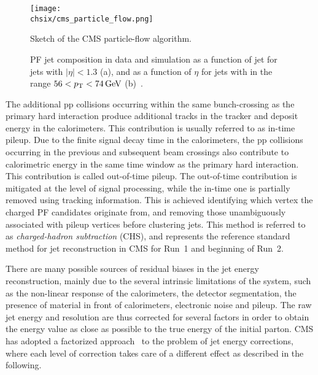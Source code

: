 \begin{figure}[!htb]
 \begin{center}
  \texttt{[image: \\chsix/cms\_particle\_flow.png]}
 \end{center}
 \caption{Sketch of the CMS particle-flow algorithm.}
 \label{fig:PFalgo}
\end{figure}

\begin{figure}[!htb]
\centering
{}
\caption{PF jet composition in data and simulation as a function of jet \pt for jets with $|\eta| < 1.3$ (a), and as a function of $\eta$ for jets with \pt in the range $56 < p_{\mathrm{T}} < 74\,\text{Ge\hspace{-.08em}V}$ (b)~\cite{Khachatryan:2016kdb}.}
\label{fig:PFjet_composition}
\end{figure}

The additional pp collisions occurring within the same bunch-crossing as the primary hard interaction produce additional tracks in the tracker and deposit energy in the calorimeters. This contribution is usually referred to as in-time pileup. Due to the finite signal decay time in the calorimeters, the pp collisions occurring in the previous and subsequent beam crossings also contribute to calorimetric energy in the same time window as the primary hard interaction. This contribution is called out-of-time pileup.
The out-of-time contribution is mitigated at the level of signal processing, while the in-time one is partially removed using tracking information. This is achieved identifying which vertex the charged PF candidates originate from, and removing those unambiguously associated with pileup vertices before clustering jets. This method is referred to as \textit{charged-hadron subtraction} (CHS), and represents the reference standard method for jet reconstruction in CMS for Run~1 and beginning of Run~2.

There are many possible sources of residual biases in the jet energy reconstruction, mainly due to the several intrinsic limitations of the system, such as the non-linear response of the calorimeters, the detector segmentation, the presence of material in front of calorimeters, electronic noise and pileup. The raw jet energy and resolution are thus corrected for several factors in order to obtain the energy value as close as possible to the true energy of the initial parton. CMS has adopted a factorized approach~\cite{1748-0221-6-11-P11002} to the problem of jet energy corrections, where each level of correction takes care of a different effect as described in the following.

